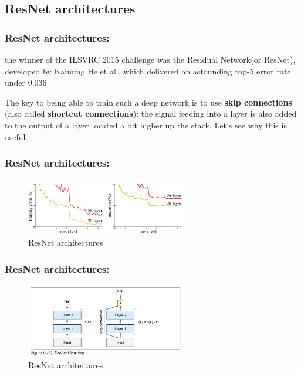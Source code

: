 \documentclass{beamer}
\begin{document}
\subsection{ResNet architectures}
    \begin{frame}
    \frametitle{ResNet architectures: }
    \par
     the winner of the ILSVRC 2015 challenge was the Residual Network(or ResNet), developed by Kaiming He et al., which delivered an astounding top-5 error rate under 0.036
     \par
      The key to being able to train such a deep network is to use \textbf{skip connections} (also called \textbf{shortcut connections}): the signal feeding into a layer is also added to the output of a layer located a bit higher up the stack. Let’s see why this is useful.
    \end{frame}
        \begin{frame}
    \frametitle{ResNet architectures: }
         \begin{figure}[H]
            \begin{center}
                \includegraphics[width=7cm]{FIGURE13-12.png}
            \end{center}
        \caption{ResNet architectures}
        \end{figure}
    \end{frame}
    \begin{frame}
    \frametitle{ResNet architectures: }
         \begin{figure}[H]
            \begin{center}
                \includegraphics[width=7cm]{FIGURE13-4.png}
            \end{center}
        \caption{ResNet architectures}
        \end{figure}
    \end{frame}
\end{document}
